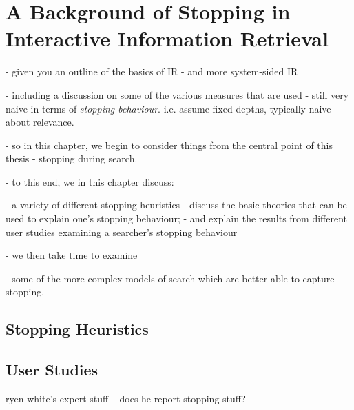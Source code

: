 
\chapter[A Background of Stopping in IIR]{A Background of Stopping in\\Interactive Information Retrieval}\label{chap:stopping_background}

- given you an outline of the basics of IR
- and more system-sided IR

- including a discussion on some of the various measures that are used
- still very naive in terms of \emph{stopping behaviour}. i.e. assume fixed depths, typically naive about relevance.

- so in this chapter, we begin to consider things from the central point of this thesis - stopping during search.

\begin{figure}[h]
    \centering
    \vspace{4mm}
    \label{fig:stopsign}
    \vspace{-5mm}
\end{figure}

- to this end, we in this chapter discuss:

- a variety of different stopping heuristics
- discuss the basic theories that can be used to explain one's stopping behaviour;
- and explain the results from different user studies examining a searcher's stopping behaviour

- we then take time to examine

- some of the more complex models of search which are better able to capture stopping.


\section{Stopping Heuristics}\label{sec:stopping_background:heuristics}

\section{User Studies}
ryen white's expert stuff -- does he report stopping stuff?


